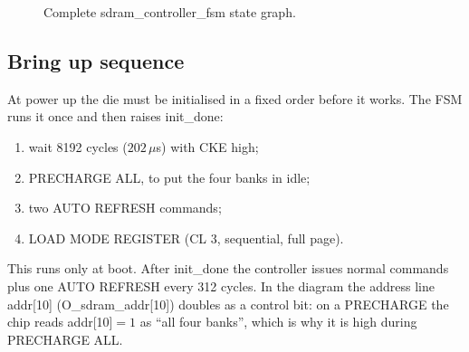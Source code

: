 \documentclass[a4paper,10pt]{article}
\begin{document}
\begin{figure}[H]
{%
}
\caption{Complete sdram\_controller\_fsm state graph.}
\label{fig:sdram-fsm}
\end{figure}

\subsection{Bring up sequence}

At power up the die must be initialised in a fixed order before it works. The FSM runs it once and then raises init\_done:
\begin{enumerate}\setlength{\itemsep}{0pt}
\item wait 8192 cycles ($202\,\mu$s) with CKE high;
\item PRECHARGE ALL, to put the four banks in idle;
\item two AUTO REFRESH commands;
\item LOAD MODE REGISTER (CL 3, sequential, full page).
\end{enumerate}
This runs only at boot. After init\_done the controller issues normal commands
plus one AUTO REFRESH every 312 cycles. In the diagram the address line
addr[10] (O\_sdram\_addr[10]) doubles as a control bit: on a PRECHARGE
the chip reads addr[10]$=1$ as ``all four banks'', which is why it is high
during PRECHARGE ALL.
\end{document}
